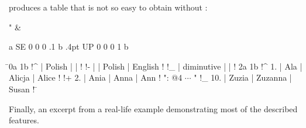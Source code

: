 \smallskip

\noindent produces a table that is not so easy to obtain without \PS:

\smallskip

\medskip \moveright\parindent
\beginanchtable
\begintableformat \right " &\center \endtableformat

 a          %
\trianfill SE {0 0 0 .1} b      %
\diagstroke .4pt UP {0 0 0 1} b %

\=
\uranchor0a \uranchor1b
\B!^     | Polish     |         |         \E!
\B!-     |            | Polish  | English \E!
\B!_     | diminutive |         |         \E!
\llanchor2a \llanchor1b
\-
\B!^  1. | Ala        | Alicja  | Alice   \E!
\B!+  2. | Ania       | Anna    | Ann     \E!
\B":               @4 $\cdots$            \E"
\B!_ 10. | Zuzia      | Zuzanna | Susan   \E!
\=

\endanchtable

\medskip

Finally, an excerpt from a real-life example demonstrating most of the
described features.

\newcount\anycount
\def\3{\afterassignment\threecont\anycount}
\def\threecont{\setbox0\hbox{\rm000}\hbox to\wd0{\hss\the\anycount}}
\def\4{\afterassignment\fourcont\anycount}
\def\fourcont{\setbox0\hbox{\rm0000}\hbox to\wd0{\hss\the\anycount}}

